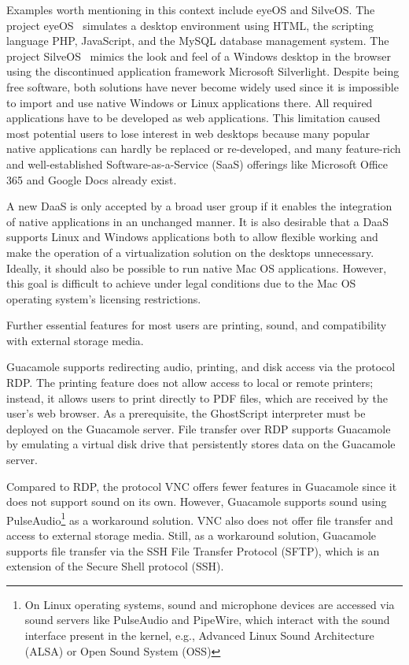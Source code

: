 \documentclass[runningheads]{llncs}
\begin{document}
Examples worth mentioning in this context include eyeOS and SilveOS.
The project eyeOS~\cite{liu2012research,vidyabanu2011implementation}
simulates a desktop environment using HTML,
the scripting language PHP, JavaScript,
and the MySQL database management system.
The project SilveOS~\cite{garmpis2016design}
mimics the look and feel of a Windows desktop in the browser
using the discontinued application framework Microsoft Silverlight.
Despite being free software,
both solutions have never become widely
used since it is impossible to import
and use native Windows or Linux applications there.
All required applications have to be developed as web applications.
This limitation caused most potential users to lose interest in web desktops
because many popular native applications can hardly be replaced or re-developed,
and many feature-rich and well-established Software-as-a-Service (SaaS)
offerings like Microsoft Office 365 and Google Docs already exist.

A new DaaS is only accepted by a broad user group if it
enables the integration of native applications in an unchanged manner.
It is also desirable that a DaaS supports Linux and Windows applications
both to allow flexible working and make the operation
of a virtualization solution on the desktops unnecessary.
Ideally, it should also be possible to run native Mac OS applications.
However, this goal is difficult to achieve under legal conditions
due to the Mac OS operating system's licensing restrictions.

Further essential features for most users are printing, sound,
and compatibility with external storage media.

Guacamole supports redirecting audio, printing,
and disk access via the protocol RDP.
The printing feature does not allow access to local or remote printers;
instead, it allows users to print directly to PDF files,
which are received by the user's web browser.
As a prerequisite, the GhostScript interpreter
must be deployed on the Guacamole server.
File transfer over RDP supports Guacamole
by emulating a virtual disk drive that persistently stores data
on the Guacamole server.~\cite{ApacheGuacamole2024}

Compared to RDP, the protocol VNC offers fewer features in Guacamole
since it does not support sound on its own.
However, Guacamole supports sound using
PulseAudio\footnote{On Linux operating systems,
	sound and microphone devices are accessed via sound servers like PulseAudio and PipeWire,
	which interact with the sound interface present in the kernel,
	e.g., Advanced Linux Sound Architecture (ALSA) or Open Sound System (OSS)}
as a workaround solution.
VNC also does not offer file transfer and access to external storage media.
Still, as a workaround solution, Guacamole supports file transfer
via the SSH File Transfer Protocol (SFTP),
which is an extension of the Secure Shell protocol (SSH).
\end{document}
